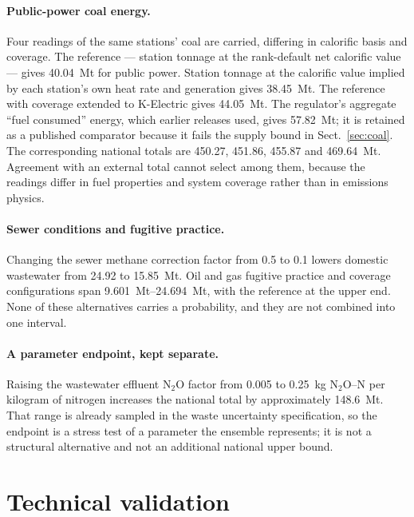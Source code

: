 \documentclass[essd,manuscript]{copernicus}
\begin{document}
\paragraph{Public-power coal energy.} Four readings of the same stations' coal are carried, differing in calorific basis and coverage. The reference --- station tonnage at the rank-default net calorific value --- gives \SI{40.04}{\mega\tonne} for public power. Station tonnage at the calorific value implied by each station's own heat rate and generation gives \SI{38.45}{\mega\tonne}. The reference with coverage extended to K-Electric gives \SI{44.05}{\mega\tonne}. The regulator's aggregate ``fuel consumed'' energy, which earlier releases used, gives \SI{57.82}{\mega\tonne}; it is retained as a published comparator because it fails the supply bound in Sect.~\ref{sec:coal}. The corresponding national totals are \SI{450.27}{}, \SI{451.86}{}, \SI{455.87}{} and \SI{469.64}{\mega\tonne}. Agreement with an external total cannot select among them, because the readings differ in fuel properties and system coverage rather than in emissions physics.

\paragraph{Sewer conditions and fugitive practice.} Changing the sewer methane correction factor from \num{0.5} to \num{0.1} lowers domestic wastewater from \SI{24.92}{} to \SI{15.85}{\mega\tonne}. Oil and gas fugitive practice and coverage configurations span \SIrange{9.601}{24.694}{\mega\tonne}, with the reference at the upper end. None of these alternatives carries a probability, and they are not combined into one interval.

\paragraph{A parameter endpoint, kept separate.} Raising the wastewater effluent N$_2$O factor from \num{0.005} to \num{0.25}~kg N$_2$O--N per kilogram of nitrogen increases the national total by approximately \SI{148.6}{\mega\tonne}. That range is already sampled in the waste uncertainty specification, so the endpoint is a stress test of a parameter the ensemble represents; it is not a structural alternative and not an additional national upper bound.

\section{Technical validation}
\label{sec:validation}
\end{document}
